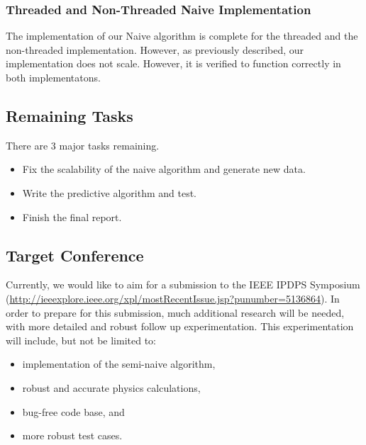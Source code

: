 \documentclass[conference]{IEEEtran}
\begin{document}
\subsubsection{Threaded and Non-Threaded Naive Implementation}
The implementation of our Naive algorithm is complete for the threaded and the non-threaded implementation.  However, as previously described, our implementation does not scale.  However, it is verified to function
correctly in both implementatons.

\subsection{Remaining Tasks}
There are 3 major tasks remaining.
\begin{itemize}
\item Fix the scalability of the naive algorithm and generate new data.
\item Write the predictive algorithm and test.
\item Finish the final report.
\end{itemize}

\subsection{Target Conference}
Currently, we would like to aim for a submission to the IEEE IPDPS Symposium (\url{http://ieeexplore.ieee.org/xpl/mostRecentIssue.jsp?punumber=5136864}).  In order to prepare for this submission, much additional research will be needed, with more detailed and robust follow up experimentation.  This experimentation will include, but not be limited to:
\begin{itemize}
\item implementation of the semi-naive algorithm,
\item robust and accurate physics calculations,
\item bug-free code base, and
\item more robust test cases.
\end{itemize}

%
%
\end{document}
